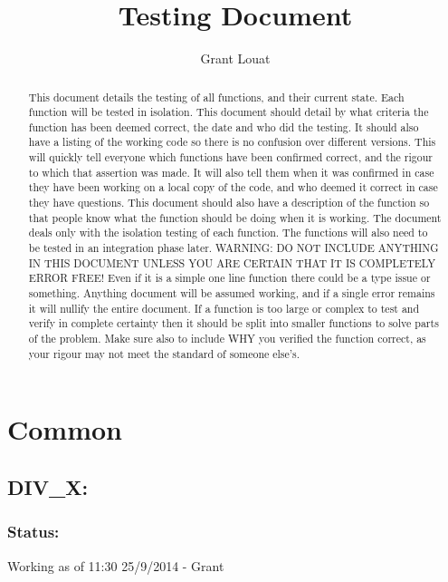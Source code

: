 \documentclass[]{article}
\title{Testing Document}
\author{Grant Louat}
\begin{document}
\maketitle

\newpage

\begin{abstract}
This document details the testing of all functions, and their current state. Each function will be tested in isolation. This document should detail by what criteria the function has been deemed correct, the date and who did the testing. It should also have a listing of the working code so there is no confusion over different versions. This will quickly tell everyone which functions have been confirmed correct, and the rigour to which that assertion was made. It will also tell them when it was confirmed in case they have been working on a local copy of the code, and who deemed it correct in case they have questions. This document should also have a description of the function so that people know what the function should be doing when it is working.\newline
The document deals only with the isolation testing of each function. The functions will also need to be tested in an integration phase later. \newline
WARNING: DO NOT INCLUDE ANYTHING IN THIS DOCUMENT UNLESS YOU ARE CERTAIN THAT IT IS COMPLETELY ERROR FREE! \newline Even if it is a simple one line function there could be a type issue or something. Anything document will be assumed working, and if a single error remains it will nullify the entire document. If a function is too large or complex to test and verify in complete certainty then it should be split into smaller functions to solve parts of the problem. Make sure also to include WHY you verified the function correct, as your rigour may not meet the standard of someone else's.
\end{abstract}

\newpage
\section{Common}

\subsection{DIV\_X:}
\subsubsection{Status:}
Working as of 11:30 25/9/2014 - Grant
\end{document}
